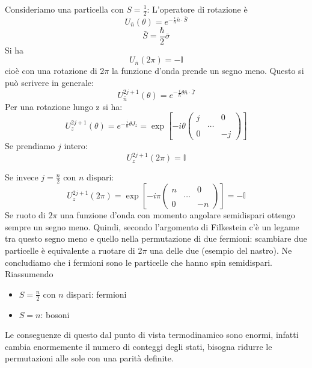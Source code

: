 Consideriamo una particella con $S=\frac{1}{2}$: L'operatore di rotazione è
\begin{equation*}
U_{\bar n}\left(\theta\right)=e^{-\frac{i}{\hbar }\bar n\cdot \bar S} 
\end{equation*}
\begin{equation*}
\bar S=\frac{\hbar }{2}\bar \sigma
\end{equation*}
Si ha
\begin{equation*}
U_{\bar n}\left(2\pi\right)=-\mathbb{I}
\end{equation*}
cioè con una rotazione di 2$\pi$ la funzione d'onda prende un segno meno.
Questo si può scrivere in generale:
\begin{equation*}
U_{\bar n}^{2j+1}\left(\theta\right)=e^{-\frac{i}{\hbar }\theta \bar n\cdot \bar J}
\end{equation*}
Per una rotazione lungo z si ha: 
\begin{equation*}
U_z^{2j+1}\left(\theta\right)=e^{-\frac{i}{\hbar }\theta J_z}=\exp{\left[-i\theta\left(\begin{matrix}j & & 0 \\ & \dots & \\ 0 & & -j\end{matrix}\right)\right]} 
\end{equation*}
Se prendiamo $j$ intero:
\begin{equation*}
U_z^{2j+1}\left(2\pi\right)= \mathbb{I}
\end{equation*}

Se invece $j=\frac{n}{2}$ con $n$ dispari:
\begin{equation*}
U_z^{2j+1}\left(2\pi\right)=\exp{\left[-i\pi\left(\begin{matrix}n & & 0 \\ & \dots & \\ 0 & & -n\end{matrix}\right)\right]}= - \mathbb{I}
\end{equation*}
Se ruoto di $2\pi$ una funzione d'onda con momento angolare semidispari ottengo sempre un segno meno. Quindi, secondo l'argomento di Filkestein c'è un legame tra questo segno meno e quello nella permutazione di due fermioni: scambiare due particelle è equivalente a ruotare di 2$\pi$ una delle due (esempio del nastro). Ne concludiamo che i fermioni sono le particelle che hanno spin semidispari. Riassumendo
\begin{itemize}
\item $S=\frac{n}{2}$ con $n$ dispari: fermioni
\item $S=n$: bosoni
\end{itemize}
Le conseguenze di questo dal punto di vista termodinamico sono enormi, infatti cambia enormemente il numero di conteggi degli stati, bisogna ridurre le permutazioni alle sole con una parità definite.

